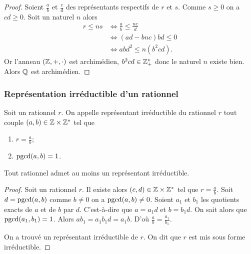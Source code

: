\begin{proof}
  Soient \(\frac{a}{b}\) et \(\frac{c}{d}\) des représentants respectifs de \(r\) et \(s\). Comme \(s \geqslant 0\) on a \(cd \geqslant 0\). Soit un naturel \(n\) alors
  \begin{align}
    r \leqslant ns &\iff \frac{a}{b} \leqslant \frac{nc}{d} \\
    &\iff (ad-bnc)bd \leqslant 0 \\
    &\iff abd^2 \leqslant n(b^2cd).
  \end{align}
  Or l'anneau \((\mathbb{Z},+,\cdot)\) est archimédien, \(b^2cd \in \mathbb{Z}^*_+\) donc le naturel \(n\) existe bien. Alors \(\mathbb{Q}\) est archimédien.
\end{proof}

\subsubsection{Représentation irréductible d'un rationnel}

\begin{defdef}
  Soit un rationnel \(r\). On appelle représentant irréductible du rationnel \(r\) tout couple \((a,b) \in \mathbb{Z} \times \mathbb{Z}^*\) tel que
  \begin{enumerate}
  \item \(r=\frac{a}{b}\);
  \item \(\operatorname{pgcd}(a,b)=1\).
  \end{enumerate}
\end{defdef}
\begin{theo}
  Tout rationnel admet au moins un représentant irréductible.
\end{theo}
\begin{proof}
  Soit un rationnel \(r\). Il existe alors \((c,d) \in \mathbb{Z} \times \mathbb{Z}^*\) tel que \(r = \frac{a}{b}\). Soit \(d= \operatorname{pgcd}(a,b)\) comme \(b \neq 0\) on a \(\operatorname{pgcd}(a,b) \neq 0\). Soient \(a_1\) et \(b_1\) les quotients exacts de \(a\) et de \(b\) par \(d\). C'est-à-dire que \(a=a_1d\) et \(b=b_1d\). On sait alors que \(\operatorname{pgcd}(a_1,b_1)=1\). Alors \(ab_1=a_1b_1d=a_1b\). D'où \(\frac{a}{b}=\frac{a_1}{b_1}\).

On a trouvé un représentant irréductible de \(r\). On dit que \(r\) est mis sous forme irréductible.
\end{proof}

